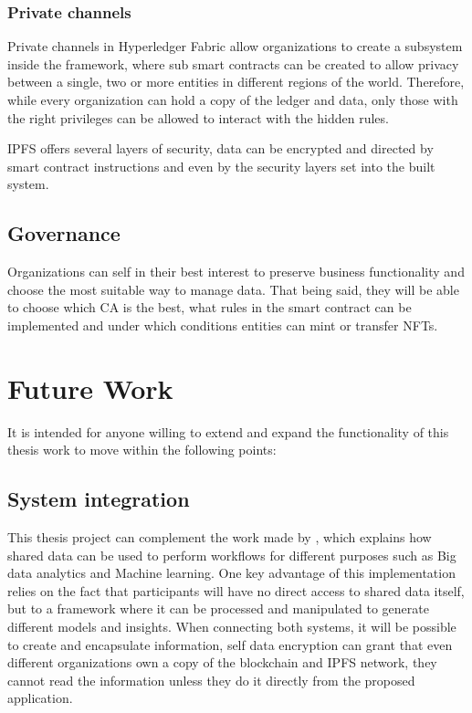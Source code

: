 \subsubsection{Private channels}
Private channels in Hyperledger Fabric allow organizations to create a subsystem inside the framework, where sub smart contracts can be created to allow privacy between a single, two or more entities in different regions of the world.
Therefore, while every organization can hold a copy of the ledger and data, only those with the right privileges can be allowed to interact with the hidden rules.

\ac{IPFS} offers several layers of security, data can be encrypted and directed by smart contract instructions and even by the security layers set into the built system. 

\subsection{Governance}
Organizations can self in their best interest to preserve business functionality and choose the most suitable way to manage data. That being said, they will be able to choose which \ac{CA} is the best, what rules in the smart contract can be implemented and under which conditions entities can mint or transfer \ac{NFT}s.


\section{Future Work}
It is intended for anyone willing to extend and expand the functionality of this thesis work to move within the following points:
\subsection{System integration}
This thesis project can complement the work made by \cite{akbarAli}, which explains how shared data can be used to perform workflows for different purposes such as Big data analytics and Machine learning. One key advantage of this implementation relies on the fact that participants will have no direct access to shared data itself, but to a framework where it can be processed and manipulated to generate different models and insights. When connecting both systems, it will be possible to create and encapsulate information, self data encryption can grant that even different organizations own a copy of the blockchain and \ac{IPFS} network, they cannot read the information unless they do it directly from the proposed application.

